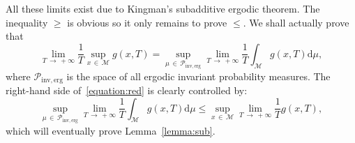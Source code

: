 \documentclass[AHL,Unicode,longabstracts,published]{cedram}
\newcommand{\mc}{\mathcal}
\newcommand{\M}{\mathcal{M}}
\newcommand{\dd}{\mathrm{d}}
\newcommand{\inverg}{\mathrm{inv,erg}}
\begin{document}
All these limits exist due to Kingman's subadditive ergodic theorem. The inequality $\geq$ is obvious so it only remains to prove $\leq$. We shall actually prove that
\begin{equation}\label{equation:red}
\lim_{T\,\rightarrow \,+\infty} \frac{1}{T} \sup_{x\,\in\,\M} g(x,T) = \sup_{\mu\,\in\,\mc{P}_{\inverg}} \lim_{T\,\rightarrow\,+\infty} \frac{1}{T}\int_{\M} g(x,T) \dd\mu,
\end{equation}
where $\mc{P}_{\inverg}$ is the space of all ergodic invariant probability measures. The right-hand side of~\eqref{equation:red} is clearly controlled by:
\[
\sup_{\mu\,\in\,\mc{P}_{\inverg}} \lim_{T\, \rightarrow\,+\infty} \frac{1}{T}\int_{\M} g(x,T) \dd\mu \leq \sup_{x\,\in\,\M} \lim_{T \,\rightarrow\,+\infty} \frac{1}{T} g(x,T),
\]
which will eventually prove Lemma~\ref{lemma:sub}.
\end{document}
